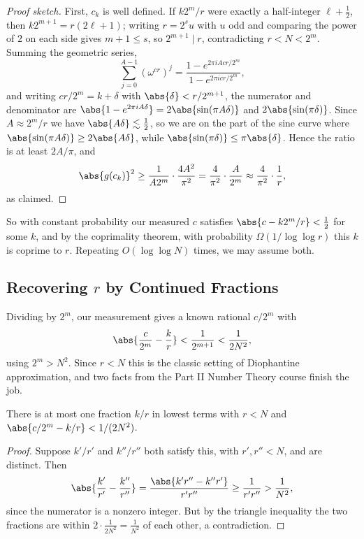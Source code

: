 \begin{proof}[Proof sketch]
	First, $c_k$ is well defined. If $k2^m/r$ were exactly a half-integer $\ell+\tfrac12$, then $k2^{m+1} = r(2\ell+1)$; writing $r = 2^su$ with $u$ odd and comparing the power of $2$ on each side gives $m+1 \le s$, so $2^{m+1}\mid r$, contradicting $r<N<2^m$. Summing the geometric series,
	$$\sum_{j=0}^{A-1}\left(\omega^{cr}\right)^j = \frac{1-e^{2\pi iAcr/2^m}}{1-e^{2\pi icr/2^m}},$$
	and writing $cr/2^m = k + \delta$ with $\abs{\delta}< r/2^{m+1}$, the numerator and denominator are $\abs{1 - e^{2\pi iA\delta}} = 2\abs{\sin(\pi A\delta)}$ and $2\abs{\sin(\pi\delta)}$. Since $A\approx 2^m/r$ we have $\abs{A\delta}\lesssim\tfrac12$, so we are on the part of the sine curve where $\abs{\sin(\pi A\delta)}\geq2\abs{A\delta}$, while $\abs{\sin(\pi\delta)}\leq\pi\abs{\delta}$. Hence the ratio is at least $2A/\pi$, and
	$$\abs{g(c_k)}^2\geq\frac{1}{A2^m}\cdot\frac{4A^2}{\pi^2} = \frac{4}{\pi^2}\cdot\frac{A}{2^m}\approx\frac{4}{\pi^2}\cdot\frac1r,$$
	as claimed.
\end{proof}

So with constant probability our measured $c$ satisfies $\abs{c - k2^m/r}<\tfrac12$ for some $k$, and by the coprimality theorem, with probability $\Omega(1/\log\log r)$ this $k$ is coprime to $r$. Repeating $O(\log\log N)$ times, we may assume both.

\subsection{Recovering \texorpdfstring{$r$}{r} by Continued Fractions}

Dividing by $2^m$, our measurement gives a known rational $c/2^m$ with
$$\abs{\frac{c}{2^m}-\frac kr}<\frac1{2^{m+1}}<\frac1{2N^2},$$
using $2^m>N^2$. Since $r<N$ this is the classic setting of Diophantine approximation, and two facts from the Part II Number Theory course finish the job.

\begin{lemma}
	There is at most one fraction $k/r$ in lowest terms with $r<N$ and $\abs{c/2^m - k/r}<1/(2N^2)$.
\end{lemma}

\begin{proof}
	Suppose $k'/r'$ and $k''/r''$ both satisfy this, with $r',r''<N$, and are distinct. Then
	$$\abs{\frac{k'}{r'}-\frac{k''}{r''}} = \frac{\abs{k'r''-k''r'}}{r'r''}\geq\frac{1}{r'r''}>\frac1{N^2},$$
	since the numerator is a nonzero integer. But by the triangle inequality the two fractions are within $2\cdot\frac1{2N^2} = \frac1{N^2}$ of each other, a contradiction.
\end{proof}


